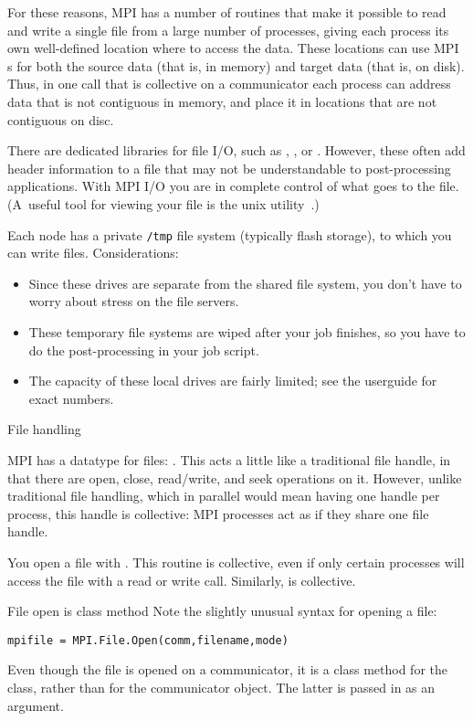 For these reasons, MPI has a number of routines that make it possible
to read and write a single file from a large number of processes,
giving each process its own well-defined location where to access the data.
These locations can use MPI
s for both the source data (that is, in memory)
and target data (that is, on disk).
Thus, in one call that is collective on a communicator
each process can address data that is not contiguous in memory,
and place it in locations that are not contiguous on disc.

There are dedicated libraries for file I/O, such as ,
, or . However, these often add
header information to a file that may not be understandable to
post-processing applications. With MPI I/O you are in complete control
of what goes to the file. (A~useful tool for viewing your file is the
unix utility~.)

\begin{taccnote}
  Each node has a private \verb+/tmp+ file system
  (typically flash storage), to which
  you can write files. Considerations:
  \begin{itemize}
  \item Since these drives are separate from the shared file system,
    you don't have to worry about stress on the file servers.
  \item These temporary file systems are wiped after your job finishes,
    so you have to do the post-processing in your job script.
  \item The capacity of these local drives are fairly limited;
    see the userguide for exact numbers.
  \end{itemize}
\end{taccnote}

 {File handling}

MPI has a datatype for files: .
This acts a little like a traditional file handle,
in that there are open, close, read/write, and seek operations on it.
However, unlike traditional file handling,
which in parallel would mean having one handle per process,
this handle is collective: MPI processes
act as if they share one file handle.

You open a file with
%
.
%
This routine is collective, even if only certain processes will access
the file with a read or write call.
Similarly,  is collective.

\begin{pythonnote}{File open is class method}
  Note the slightly unusual syntax for opening a file:
\begin{lstlisting}
mpifile = MPI.File.Open(comm,filename,mode)
\end{lstlisting}
  Even though the file is
  opened on a communicator, it is a class method for the 
  class, rather than for the communicator object. The latter is passed
  in as an argument.
\end{pythonnote}

